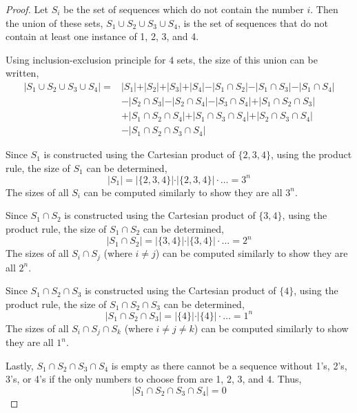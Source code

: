 \documentclass{article}
\begin{document}
\begin{proof}

  Let $S_i$ be the set of sequences which do not contain the number $i$. Then
  the union of these sets, $ S_1 \cup S_2 \cup S_3 \cup S_4 $, is the set of
  sequences that do not contain at least one instance of 1, 2, 3, and 4.

  Using inclusion-exclusion principle for $4$ sets, the size of this union can
  be written,
  \begin{align*}
    \vert S_1 \cup S_2 \cup S_3 \cup S_4 \vert = &\vert S_1 \vert + \vert S_2
    \vert + \vert S_3 \vert + \vert S_4 \vert - \vert S_1 \cap S_2 \vert - \vert
    S_1 \cap S_3 \vert - \vert S_1 \cap S_4 \vert \\
    & - \vert S_2 \cap S_3 \vert - \vert S_2 \cap S_4 \vert - \vert S_3 \cap S_4
    \vert + \vert S_1 \cap S_2 \cap S_3 \vert \\
    & + \vert S_1 \cap S_2 \cap S_4 \vert + \vert S_1 \cap S_3 \cap S_4 \vert +
    \vert S_2 \cap S_3 \cap S_4 \vert \\
    & - \vert S_1 \cap S_2 \cap S_3 \cap S_4 \vert
  \end{align*}

  Since $S_1$ is constructed using the Cartesian product of $\{2, 3, 4\}$, using
  the product rule, the size of $S_1$ can be determined,
  $$ \vert S_1 \vert = \vert \{ 2, 3, 4 \} \vert \cdot \vert \{2, 3, 4\} \vert
  \cdot \ldots = 3^n $$
  The sizes of all $S_i$ can be computed similarly to show they are all $3^n$.

  Since $S_1 \cap S_2$ is constructed using the Cartesian product of $\{3, 4\}$,
  using the product rule, the size of $S_1 \cap S_2$ can be determined,
  $$ \vert S_1 \cap S_2 \vert = \vert \{3, 4\} \vert \cdot \vert \{3, 4\} \vert
  \cdot \ldots = 2^n $$
  The sizes of all $S_i \cap S_j$ (where $i \neq j$) can be computed similarly
  to show they are all $2^n$.

  Since $S_1 \cap S_2 \cap S_3$ is constructed using the Cartesian product of
  $\{4\}$, using the product rule, the size of $S_1 \cap S_2 \cap S_3$ can be
  determined,
  $$ \vert S_1 \cap S_2 \cap S_3 \vert = \vert \{4\} \vert \cdot \vert \{4\}
  \vert \cdot \ldots = 1^n $$
  The sizes of all $S_i \cap S_j \cap S_k$ (where $i \neq j \neq k$) can be
  computed similarly to show they are all $1^n$.

  Lastly, $S_1 \cap S_2 \cap S_3 \cap S_4$ is empty as there cannot be a
  sequence without 1's, 2's, 3's, or 4's if the only numbers to choose from are
  1, 2, 3, and 4. Thus,
  $$ \vert S_1 \cap S_2 \cap S_3 \cap S_4 \vert = 0 $$


\end{proof}
\end{document}

